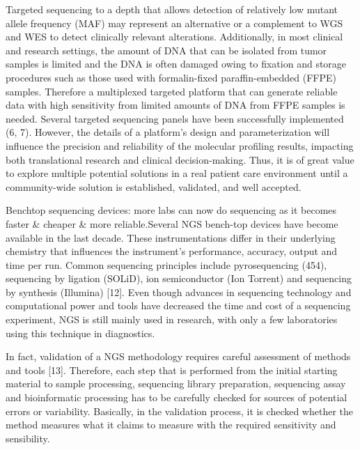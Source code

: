 Targeted sequencing to a depth that allows detection of relatively low mutant
allele frequency (MAF) may represent an alternative or a complement to WGS and
WES to detect clinically relevant alterations. Additionally, in most clinical
and research settings, the amount of DNA that can be isolated from tumor samples
is limited and the DNA is often damaged owing to fixation and storage procedures
such as those used with formalin-fixed paraffin-embedded (FFPE) samples.
Therefore a multiplexed targeted platform that can generate reliable data with
high sensitivity from limited amounts of DNA from FFPE samples is needed.
Several targeted sequencing panels have been successfully implemented (6, 7).
However, the details of a platform's design and parameterization will influence
the precision and reliability of the molecular profiling results, impacting both
translational research and clinical decision-making. Thus, it is of great value
to explore multiple potential solutions in a real patient care environment until
a community-wide solution is established, validated, and well accepted.

Benchtop sequencing devices: more labs can now do sequencing as it becomes
faster \& cheaper \& more reliable.Several NGS bench-top devices have become
available in the last decade. These instrumentations differ in their underlying
chemistry that influences the instrument’s performance, accuracy, output and
time per run. Common sequencing principles include pyrosequencing (454),
sequencing by ligation (SOLiD), ion semiconductor (Ion Torrent) and sequencing
by synthesis (Illumina) [12]. Even though advances in sequencing technology and
computational power and tools have decreased the time and cost of a sequencing
experiment, NGS is still mainly used in research, with only a few laboratories
using this technique in diagnostics.

In fact, validation of a NGS methodology requires careful assessment of methods
and tools [13]. Therefore, each step that is performed from the initial starting
material to sample processing, sequencing library preparation, sequencing assay
and bioinformatic processing has to be carefully checked for sources of
potential errors or variability. Basically, in the validation process, it is
checked whether the method measures what it claims to measure with the required
sensitivity and sensibility.

